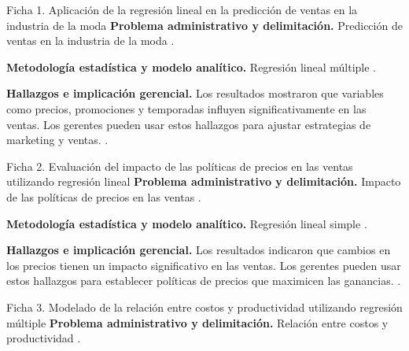 {
\begin{fichainvestigacion}{Ficha 1. Aplicación de la regresión lineal en la predicción de ventas en la industria de la moda}
\textbf{Problema administrativo y delimitación.} Predicción de ventas en la industria de la moda \citep{anderson2012,holmesBusiness2023}.

\textbf{Metodología estadística y modelo analítico.} Regresión lineal múltiple \citep{wackerly2010,lind2012}.

\textbf{Hallazgos e implicación gerencial.} Los resultados mostraron que variables como precios, promociones y temporadas influyen significativamente en las ventas. Los gerentes pueden usar estos hallazgos para ajustar estrategias de marketing y ventas. \citep{nistHandbook}.
\end{fichainvestigacion}

\begin{fichainvestigacion}{Ficha 2. Evaluación del impacto de las políticas de precios en las ventas utilizando regresión lineal}
\textbf{Problema administrativo y delimitación.} Impacto de las políticas de precios en las ventas \citep{anderson2012,holmesBusiness2023}.

\textbf{Metodología estadística y modelo analítico.} Regresión lineal simple \citep{wackerly2010,lind2012}.

\textbf{Hallazgos e implicación gerencial.} Los resultados indicaron que cambios en los precios tienen un impacto significativo en las ventas. Los gerentes pueden usar estos hallazgos para establecer políticas de precios que maximicen las ganancias. \citep{nistHandbook}.
\end{fichainvestigacion}

\begin{fichainvestigacion}{Ficha 3. Modelado de la relación entre costos y productividad utilizando regresión múltiple}
\textbf{Problema administrativo y delimitación.} Relación entre costos y productividad \citep{anderson2012,holmesBusiness2023}.


\end{fichainvestigacion}}
